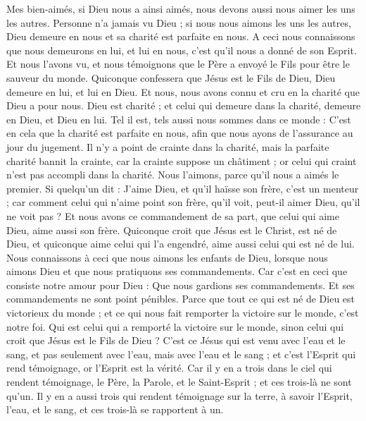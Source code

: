 \begin{multicols}{2}
Mes bien-aimés, si Dieu nous a ainsi aimés, nous devons aussi nous aimer les uns les autres.
Personne n'a jamais vu Dieu ; si nous nous aimons les uns les autres, Dieu demeure en nous et sa charité est parfaite en nous.
A ceci nous connaissons que nous demeurons en lui, et lui en nous, c'est qu'il nous a donné de son Esprit.
Et nous l'avons vu, et nous témoignons que le Père a envoyé le Fils pour être le sauveur du monde.
Quiconque confessera que Jésus est le Fils de Dieu, Dieu demeure en lui, et lui en Dieu.
Et nous, nous avons connu et cru en la charité que Dieu a pour nous. Dieu est charité ; et celui qui demeure dans la charité, demeure en Dieu, et Dieu en lui.
Tel il est, tels aussi nous sommes dans ce monde : C’est en cela que la charité est parfaite en nous, afin que nous ayons de l’assurance au jour du jugement.
Il n'y a point de crainte dans la charité, mais la parfaite charité bannit la crainte, car la crainte suppose un châtiment ; or celui qui craint n'est pas accompli dans la charité.
Nous l'aimons, parce qu'il nous a aimés le premier.
Si quelqu'un dit : J'aime Dieu, et qu’il haïsse son frère, c’est un menteur ; car comment celui qui n'aime point son frère, qu'il voit, peut-il aimer Dieu, qu’il ne voit pas ?
Et nous avons ce commandement de sa part, que celui qui aime Dieu, aime aussi son frère.
\VerseOne{}Quiconque croit que Jésus est le Christ, est né de Dieu, et quiconque aime celui qui l'a engendré, aime aussi celui qui est né de lui.
Nous connaissons à ceci que nous aimons les enfants de Dieu, lorsque nous aimons Dieu et que nous pratiquons ses commandements.
Car c'est en ceci que consiste notre amour pour Dieu : Que nous gardions ses commandements. Et ses commandements ne sont point pénibles.
Parce que tout ce qui est né de Dieu est victorieux du monde ; et ce qui nous fait remporter la victoire sur le monde, c'est notre foi.
Qui est celui qui a remporté la victoire sur le monde, sinon celui qui croit que Jésus est le Fils de Dieu ?
C'est ce Jésus qui est venu avec l’eau et le sang, et pas seulement avec l'eau, mais avec l'eau et le sang ; et c'est l'Esprit qui rend témoignage, or l'Esprit est la vérité.
Car il y en a trois dans le ciel qui rendent témoignage, le Père, la Parole, et le Saint-Esprit ; et ces trois-là ne sont qu'un.
Il y en a aussi trois qui rendent témoignage sur la terre, à savoir l'Esprit, l'eau, et le sang, et ces trois-là se rapportent à un.

\end{multicols}
